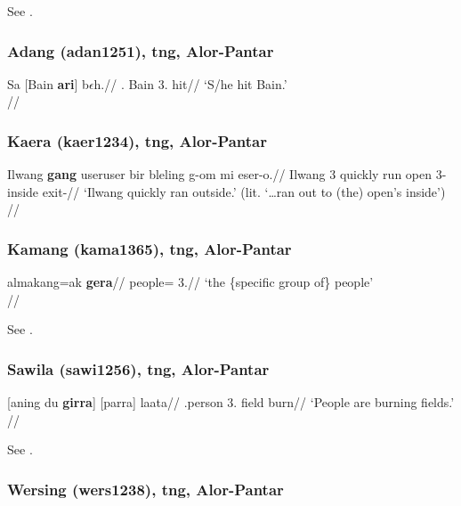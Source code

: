 See \citet[53f., 167, 190f., 353]{reesink1987}.


\subsubsection{Adang (adan1251), \gls{tng}, Alor-Pantar}

\ex 
\begingl
\gla Sa [Bain \textbf{\textglotstop{}ari}] b$\epsilon$h.//
\Sg.\Sbj{} Bain 3.\Obj{} hit//
\glft `S/he hit Bain.'\\\citep[261, (165)]{robinsonhaan2014}//
\endgl
\xe

\subsubsection{Kaera (kaer1234), \gls{tng}, Alor-Pantar}

\ex 
\begingl
\gla Ilwang \textbf{gang} user\texttildelow{}user bir bleling g-om mi eser-o.//
\glb Ilwang 3\Sg{} \Redup\texttildelow{}quickly run open 3\Sg{}-inside \Loc{} exit-\Fin{}//
\glft `Ilwang quickly ran outside.' (lit. `\ldots ran out to (the) open's inside')\\\citep[129, (98)]{klamer2014}//
\endgl
\xe

\newpage

\subsubsection{Kamang (kama1365), \gls{tng}, Alor-Pantar}

\ex
\begingl 
\gla almakang=ak \textbf{gera}//
\glb people=\Def{} 3.\Contr{}//
\glft `the \{specific group of\} people'\\{\citep[313f., (58a)]{schapper2014}}//
\endgl
\xe

See \citet[313f.]{schapper2014}.

\subsubsection{Sawila (sawi1256), \gls{tng}, Alor-Pantar}

\ex \begingl
\gla {}[aning du \textbf{girra}] [parra] laata//
\glb \Nfin.person \Pl{} 3.\Aarg{} field burn//
\glft `People are burning fields.'\\ \citep[392, (102f)]{kratochvil2014}//
\endgl
\xe

See \citealp[391f.]{kratochvil2014}.
 
\subsubsection{Wersing (wers1238), \gls{tng}, Alor-Pantar}

